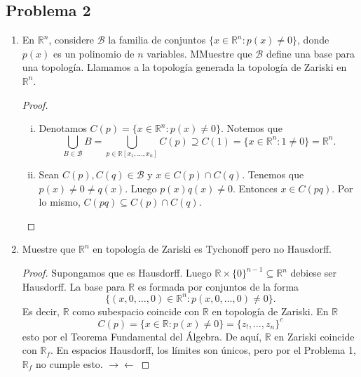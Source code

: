 \documentclass{article}
\theoremstyle{definition}
\theoremstyle{remark}
\numberwithin{equation}{section}
\newcommand{\B}{\mathcal{B}}
\newcommand{\R}{\mathbb{R}}
\begin{document}
\newpage
\subsection{Problema 2}
\begin{enumerate}
  \item En $\R^n$, considere $\B$ la familia de conjuntos $\{x \in \R^n \colon p(x) \neq 0\}$, donde $p(x)$ es un polinomio de $n$ variables. MMuestre que $\B$ define una base para una topología. Llamamos a la topología generada la topología de Zariski en $\R^n$.
  \begin{proof}
    \
    \begin{enumerate}[(i)]
      \item Denotamos $C(p) = \{x \in \R^n \colon p(x) \neq 0\}$. Notemos que
      \[\bigcup_{B \in \B} B = \bigcup_{p \in \R[x_1,\dots,x_n]} C(p) \supseteq C(1) = \{x \in \R^n \colon 1 \neq 0\} = \R^n.\]
      \item Sean $C(p), C(q) \in \B$ y $x \in C(p) \cap C(q)$. Tenemos que $p(x) \neq 0 \neq q(x)$. Luego $p(x) q(x) \neq 0$. Entonces $x \in C(pq)$. Por lo mismo, $C(pq) \subseteq C(p) \cap C(q)$.
    \end{enumerate}
  \end{proof}

  \item Muestre que $\R^n$ en topología de Zariski es Tychonoff pero no Hausdorff.
  \begin{proof}
    Supongamos que es Hausdorff. Luego $\R \times \{0\}^{n-1} \subseteq \R^n$ debiese ser Hausdorff. La base para $\R$ es formada por conjuntos de la forma
    \[\{(x,0,\dots,0) \in \R^n \colon p(x,0,\dots,0) \neq 0\}.\]
    Es decir, $\R$ como subespacio coincide con $\R$ en topología de Zariski. En $\R$
    \[C(p) = \{x \in \R \colon p(x) \neq 0\} = \{z_!,\dots,z_n\}^c\]
    esto por el Teorema Fundamental del Álgebra. De aquí, $\R$ en Zariski coincide con $\R_f$.
    En espacios Hausdorff, los límites son únicos, pero por el Problema 1, $\R_f$ no cumple esto. $\to\gets$
  \end{proof}
\end{enumerate}

\newpage
\end{document}
